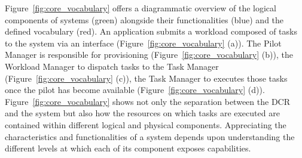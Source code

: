 \documentclass{sig-alternate}
\begin{document}


Figure~\ref{fig:core_vocabulary} offers a diagrammatic overview of the logical
components of \pilot systems (green) alongside their functionalities (blue) and
the defined vocabulary (red). An application submits a workload composed of
tasks to the \pilot system via an interface (Figure~\ref{fig:core_vocabulary}
(a)). The Pilot Manager is responsible for \pilot provisioning
(Figure~\ref{fig:core_vocabulary} (b)), the Workload Manager to dispatch tasks
to the Task Manager (Figure~\ref{fig:core_vocabulary} (c)), the Task Manager to
executes those tasks once the pilot has become available
(Figure~\ref{fig:core_vocabulary} (d)). Figure~\ref{fig:core_vocabulary} shows
not only the separation between the DCR and the \pilot system but also how the
resources on which tasks are executed are contained within different logical and
physical components. Appreciating the characteristics and functionalities of a
\pilot system depends upon understanding the different levels at which each of
its component exposes capabilities.

\end{document}
